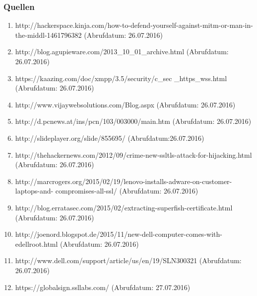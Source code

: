 \documentclass{beamer}
\begin{document}
    	\begin{frame}
    		\frametitle{Quellen}
    		\begin{tiny}
	    		\begin{enumerate}
		    		\item {http://hackerspace.kinja.com/how-to-defend-yourself-against-mitm-or-man-in-
	    			the-middl-1461796382 (Abrufdatum: 26.07.2016)}
	    			\item {http://blog.agupieware.com/2013\_10\_01\_archive.html (Abrufdatum: 26.07.2016)}
	    			\item {https://kaazing.com/doc/xmpp/3.5/security/c\_sec
	    				\_https\_wss.html} (Abrufdatum: 26.07.2016)
		    		\item {http://www.vijaywebsolutions.com/Blog.aspx (Abrufdatum: 26.07.2016)}
	    			\item {http://d.pcnews.at/ins/pcn/103/003000/main.htm (Abrufdatum: 26.07.2016)}
	    			\item {http://slideplayer.org/slide/855695/ (Abrufdatum:26.07.2016)}
	    			\item {http://thehackernews.com/2012/09/crime-new-ssltls-attack-for-hijacking.html \\(Abrufdatum: 26.07.2016)}
	    			\item {http://marcrogers.org/2015/02/19/lenovo-installs-adware-on-customer-laptops-and-
	    				compromises-all-ssl/ (Abrufdatum: 26.07.2016)}
	    			\item {http://blog.erratasec.com/2015/02/extracting-superfish-certificate.html \\ (Abrufdatum: 26.07.2016)}
	    			\item {http://joenord.blogspot.de/2015/11/new-dell-computer-comes-with-edellroot.html (Abrufdatum: 26.07.2016)}
	    			\item {http://www.dell.com/support/article/us/en/19/SLN300321 (Abrufdatum: 26.07.2016)}
	    			\item {https://globalsign.ssllabs.com/ (Abrufdatum: 27.07.2016)}
	    		\end{enumerate}
    		\end{tiny}
    	\end{frame}    
\end{document}
